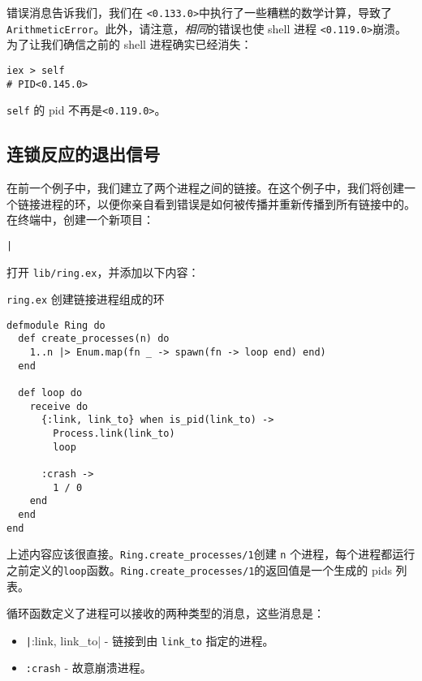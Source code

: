 错误消息告诉我们，我们在 \texttt{<0.133.0>}中执行了一些糟糕的数学计算，导致了\texttt{ArithmeticError}。此外，请注意，\emph{相同}的错误也使
shell 进程 \texttt{<0.119.0>}崩溃。为了让我们确信之前的 shell 进程确实已经消失：

\begin{code}{}
\begin{verbatim}
iex > self
# PID<0.145.0>
\end{verbatim}
\end{code}

\texttt{self} 的 pid 不再是\texttt{<0.119.0>}。

 \subsection{连锁反应的退出信号}

在前一个例子中，我们建立了两个进程之间的链接。在这个例子中，我们将创建一个链接进程的环，以便你亲自看到错误是如何被传播并重新传播到所有链接中的。在终端中，创建一个新项目：

\texttt|%

打开 \texttt{lib/ring.ex}，并添加以下内容：

\begin{code}{\texttt{ring.ex} 创建链接进程组成的环}
\begin{verbatim}
defmodule Ring do
  def create_processes(n) do
    1..n |> Enum.map(fn _ -> spawn(fn -> loop end) end)
  end

  def loop do
    receive do
      {:link, link_to} when is_pid(link_to) ->
        Process.link(link_to)
        loop

      :crash ->
        1 / 0
    end
  end
end
\end{verbatim}
\label{lst:create_processes_ring}  
\end{code}

上述内容应该很直接。\texttt{Ring.create\_processes/1}创建 \texttt{n} 个进程，每个进程都运行之前定义的\texttt{loop}函数。\texttt{Ring.create\_processes/1}的返回值是一个生成的 pids 列表。

循环函数定义了进程可以接收的两种类型的消息，这些消息是：

\begin{itemize}
\item  \texttt|{:link, link_to}| - 链接到由  \texttt{link\_to} 指定的进程。
\item  \texttt{:crash} - 故意崩溃进程。
\end{itemize}

